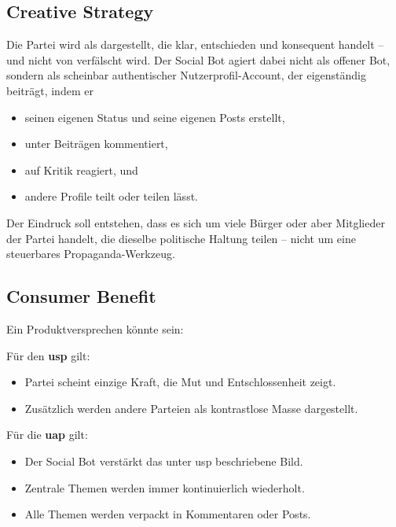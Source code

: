 \subsection{Creative Strategy}
\label{sec:04-04-02_creative-strategy}

Die Partei wird als  dargestellt, die klar, entschieden und konsequent handelt -- und nicht von  verfälscht wird. Der Social Bot agiert dabei nicht als offener Bot, sondern als scheinbar authentischer Nutzerprofil-Account, der eigenständig beiträgt, indem er

\begin{itemize}
    \item seinen eigenen Status und seine eigenen Posts erstellt,
    \item unter Beiträgen kommentiert,
    \item auf Kritik reagiert, und
    \item andere Profile teilt oder teilen lässt.
\end{itemize}

Der Eindruck soll entstehen, dass es sich um viele  Bürger oder aber Mitglieder der Partei handelt, die dieselbe politische Haltung teilen -- nicht um eine steuerbares Propaganda-Werkzeug.

\subsection{Consumer Benefit}
\label{sec:04-04-03_consumer-benefit}

Ein Produktversprechen könnte sein: 

Für den \textbf{\Gls{usp}} gilt:

\begin{itemize}
    \item Partei scheint einzige Kraft, die Mut und Entschlossenheit zeigt.
    \item Zusätzlich werden andere Parteien als kontrastlose Masse dargestellt.
\end{itemize}

Für die \textbf{\Gls{uap}} gilt:

\begin{itemize}
    \item Der Social Bot verstärkt das unter \Gls{usp} beschriebene Bild.
    \item Zentrale Themen werden immer kontinuierlich wiederholt.
    \item Alle Themen werden verpackt in Kommentaren oder Posts.
\end{itemize}

